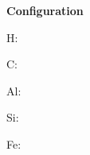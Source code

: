 \documentclass[11pt]{article}
\begin{document}
{\bfseries Configuration}

H:  \par
C:  \par
Al:  \par
Si:  \par
Fe:  \par
\end{document}
